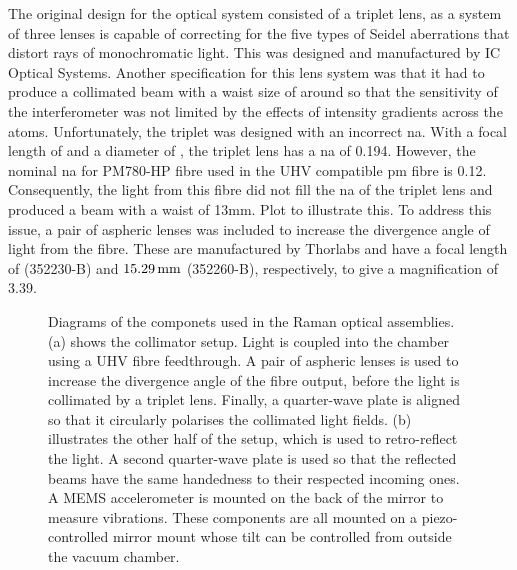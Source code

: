 The original design for the optical system consisted of a triplet lens, as a system of three lenses is capable of correcting for the five types of Seidel aberrations that distort rays of monochromatic light. This was designed and manufactured by IC Optical Systems. Another specification for this lens system was that it had to produce a collimated beam with a waist size of around  so that the sensitivity of the interferometer was not limited by the effects of intensity gradients across the atoms. Unfortunately, the triplet was designed with an incorrect \ac{na}. With a focal length of  and a diameter of , the triplet lens has a \ac{na} of 0.194. However, the nominal \ac{na} for PM780-HP fibre used in the UHV compatible \ac{pm} fibre is 0.12. Consequently, the light from this fibre did not fill the \ac{na} of the triplet lens and produced a beam with a waist of 13mm. {\huge Plot to illustrate this}. To address this issue, a pair of aspheric lenses was included to increase the divergence angle of light from the fibre. These are manufactured by Thorlabs and have a focal length of  (352230-B) and \(\sivalue{15.29}{\milli\metre}\) (352260-B), respectively, to give a magnification of 3.39. 
\begin{figure}
    \centering
    \def\svgwidth{\columnwidth}
\subfloat[][]{\scalebox{0.4}{\label{fig:raman_collimator}}}
\subfloat[][]{\scalebox{0.4}{\label{fig:mirror_mount}}}
    \caption[Drawings of the compenets used in the Raman optics assemblies]{Diagrams of the componets used in the Raman optical assemblies. (a) shows the collimator setup. Light is coupled into the chamber using a UHV fibre feedthrough.  A pair of aspheric lenses is used to increase the divergence angle of the fibre output, before the light is collimated by a triplet lens. Finally, a quarter-wave plate is aligned so that it circularly polarises the collimated light fields. (b) illustrates the other half of the setup, which is used to retro-reflect the light. A second quarter-wave plate is used so that the reflected beams have the same handedness to their respected incoming ones. A MEMS accelerometer is mounted on the back of the mirror to measure vibrations. These components are all mounted on a piezo-controlled mirror mount whose tilt can be controlled from outside the vacuum chamber.}
    \label{fig:raman_optics}
\end{figure} 
